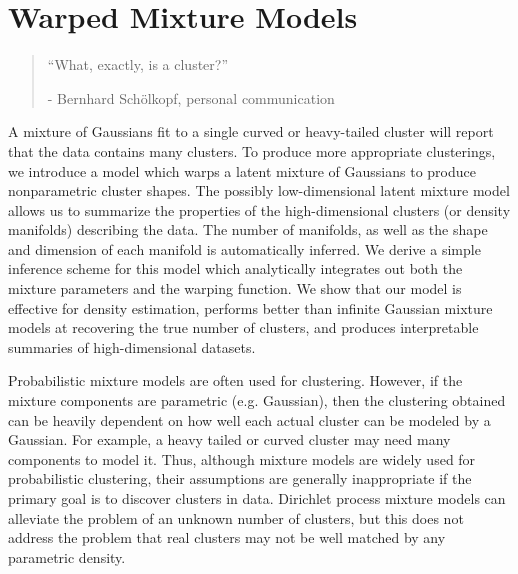 
\inbpdocument

\chapter{Warped Mixture Models}  %
\label{ch:warped}

\begin{quotation}
``What, exactly, is a cluster?''

\hspace*{\fill} - Bernhard Sch\"{o}lkopf, personal communication
\end{quotation}


A mixture of Gaussians fit to a single curved or heavy-tailed cluster will report that the data contains many clusters.  
To produce more appropriate clusterings, we introduce a model which warps a latent mixture of Gaussians to produce nonparametric cluster shapes.  
The possibly low-dimensional latent mixture model allows us to summarize the properties of the high-dimensional clusters (or density manifolds) describing the data.  
The number of manifolds, as well as the shape and dimension of each manifold is automatically inferred.
We derive a simple inference scheme for this model which analytically integrates out both the mixture parameters and the warping function.  
We show that our model is effective for density estimation, performs better than infinite Gaussian mixture models at recovering the true number of clusters, and produces interpretable summaries of high-dimensional datasets.




Probabilistic mixture models are often used for clustering.
However, if the mixture components are parametric (e.g. Gaussian), then the clustering obtained can be heavily dependent on how well each actual cluster can be modeled by a Gaussian.
For example, a heavy tailed or curved cluster may need many components to model it.
Thus, although mixture models are widely used for probabilistic clustering, their assumptions are generally inappropriate if the primary goal is to discover clusters in data.
Dirichlet process mixture models can alleviate the problem of an unknown number of clusters, but this does not address the problem that real clusters may not be well matched by any parametric density.

